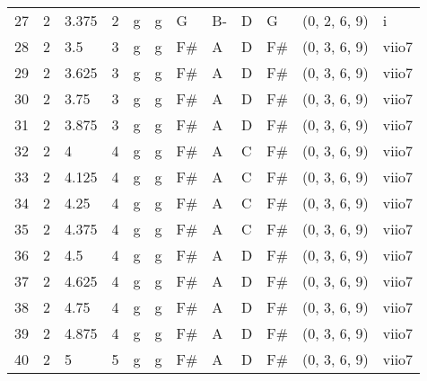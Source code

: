 \begin{tabular}{llllllllllll}
27  & 2       & 3.375  & 2               & g          & g              & G      & B-      & D      & G         & (0, 2, 6, 9)     & i              \\
28  & 2       & 3.5    & 3               & g          & g              & F#     & A       & D      & F#        & (0, 3, 6, 9)     & viio7          \\
29  & 2       & 3.625  & 3               & g          & g              & F#     & A       & D      & F#        & (0, 3, 6, 9)     & viio7          \\
30  & 2       & 3.75   & 3               & g          & g              & F#     & A       & D      & F#        & (0, 3, 6, 9)     & viio7          \\
31  & 2       & 3.875  & 3               & g          & g              & F#     & A       & D      & F#        & (0, 3, 6, 9)     & viio7          \\
32  & 2       & 4      & 4               & g          & g              & F#     & A       & C      & F#        & (0, 3, 6, 9)     & viio7          \\
33  & 2       & 4.125  & 4               & g          & g              & F#     & A       & C      & F#        & (0, 3, 6, 9)     & viio7          \\
34  & 2       & 4.25   & 4               & g          & g              & F#     & A       & C      & F#        & (0, 3, 6, 9)     & viio7          \\
35  & 2       & 4.375  & 4               & g          & g              & F#     & A       & C      & F#        & (0, 3, 6, 9)     & viio7          \\
36  & 2       & 4.5    & 4               & g          & g              & F#     & A       & D      & F#        & (0, 3, 6, 9)     & viio7          \\
37  & 2       & 4.625  & 4               & g          & g              & F#     & A       & D      & F#        & (0, 3, 6, 9)     & viio7          \\
38  & 2       & 4.75   & 4               & g          & g              & F#     & A       & D      & F#        & (0, 3, 6, 9)     & viio7          \\
39  & 2       & 4.875  & 4               & g          & g              & F#     & A       & D      & F#        & (0, 3, 6, 9)     & viio7          \\
40  & 2       & 5      & 5               & g          & g              & F#     & A       & D      & F#        & (0, 3, 6, 9)     & viio7          \\

\end{tabular}
